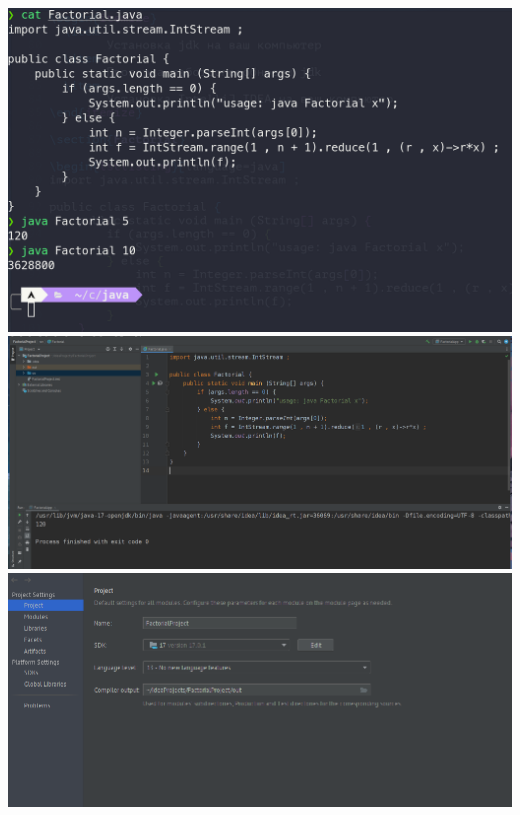 \documentclass{iu9lab}
\begin{document}
\includegraphics{terminal}
\includegraphics{intellij}
\includegraphics{settings}
\end{document}
